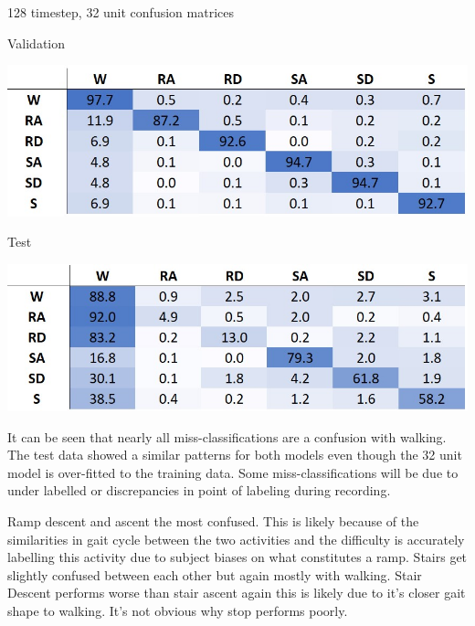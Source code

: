 \documentclass[sensors,article,submit,moreauthors,pdftex]{Definitions/mdpi}
\begin{document}
\begin{table}[!hbt]
    \centering
    \caption{128 timestep, 32 unit confusion matrices}
    \label{tab:128x32_full_model_confusion_matrix}
    \begin{subtable}{.45\textwidth}
        \centering
        \caption{Validation}
        \label{tab:full_model_conf_matrix_training_128x32}
        \includegraphics[width=\textwidth]{Figures/results/conf_matricies/Training_128x32_NT.jpg}
    \end{subtable}
    \hfil
    \begin{subtable}{.45\textwidth}
        \centering
        \caption{Test}
        \label{tab:full_model_conf_matrix_test_128x32}
        \includegraphics[width=\textwidth]{Figures/results/conf_matricies/Test_128x32_NT.jpg}
    \end{subtable}
\end{table}

It can be seen that nearly all miss-classifications are a confusion with walking. The test data showed a similar patterns for both models even though the 32 unit model is over-fitted to the training data. Some miss-classifications will be due to under labelled or discrepancies in point of labeling during recording.

Ramp descent and ascent the most confused. This is likely because of the similarities in gait cycle between the two activities and the difficulty is accurately labelling this activity due to subject biases on what constitutes a ramp. Stairs get slightly confused between each other but again mostly with walking. Stair Descent performs worse than stair ascent again this is likely due to it's closer gait shape to walking. It's not obvious why stop performs poorly.
\end{document}
